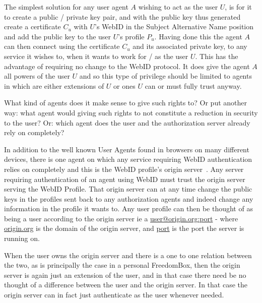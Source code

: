 \documentclass[a4paper]{llncs}
\begin{document}
The simplest solution for any user agent $A$ wishing to act as the user $U$, is for it to create a public / private key pair,  and with the public key thus generated create a certificate $C_u$ with $U$'s WebID in the Subject Alternative Name position and add the public key to the user $U$'s profile $P_u$.
Having done this the agent $A$ can then connect using the certificate $C_u$ and its associated private key, to any service it wishes to, when it wants to work for / as the user $U$.
This has the advantage of requiring no change to the WebID protocol.
It does give the agent $A$ all powers of the user $U$ and so this type of privilege should be limited to agents in which are either extensions of $U$ or ones $U$ can or must fully trust anyway.



What kind of agents does it make sense to give such rights to?
Or put another way: what agent would giving such rights to not constitute a reduction in security to the user?
Or: which agent does the user and the authorization server already rely on completely?

In addition to the well known User Agents found in browsers on many different devices, there is one agent  on which any service requiring WebID authentication relies on completely and this is the WebID profile's origin server~\cite{barth-a-2011--a}.
Any server requiring authentication of an agent using WebID must trust the origin server serving the WebID Profile.
That origin server can at any time change the public keys in the profiles sent back to any authorization agents and indeed change any information in the profile it wants to.
Any user profile can then be thought of as being a user according to the origin server ie a \url{user@origin.org:port} - where \url{origin.org} is the domain of the origin server, and \url{port} is the port the server is running on.

When the user owns the origin server and there is a one to one relation between the two, as is principally the case in a personal FreedomBox, then the origin server is again just an extension of the user, and in that case there need be no thought of a difference between the user and the origin server.
In that case the origin server can in fact just authenticate as the user whenever needed. 
\end{document}
